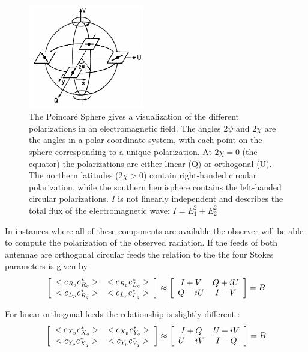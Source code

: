 \begin{figure}
\begin{mdframed}
\centering
\includegraphics[width=0.45\textwidth]{images/poincare_sphere.png}
\caption[The Poincar\'e Sphere]{The Poincar\'e Sphere gives a visualization of the different polarizations in an electromagnetic field. The angles $2\psi$ and
$2\chi$ are the angles in a polar coordinate system, with each point on the sphere corresponding to a unique polarization. At $2\chi=0$ (the equator) the polarizations
are either linear (Q) or orthogonal (U). The northern latitudes ($2\chi > 0$) contain right-handed circular polarization, while the southern hemisphere
contains the left-handed circular polarizations. $I$ is not linearly independent and describes the total flux of the electromagnetic wave: 
$I = E_1^2 + E_2^2$ \cite{wilson2009tools}}
\label{fig_poincare}
\end{mdframed}
\end{figure}

In instances where all of these components are available the observer will be able to compute the polarization of
the observed radiation. If the feeds of both antennae are orthogonal circular feeds the relation to
the the four Stokes parameters is given by
\begin{equation}
    \left[\begin{array}{c c}
     <e_{R_p}e_{R_q}^*> & <e_{R_p}e_{L_q}^*> \\
     <e_{L_p}e_{R_q}^*> & <e_{L_p}e_{L_q}^*> \\
    \end{array}\right] \approx 
    \left[\begin{array}{c c}
     I + V & Q + iU \\
     Q - iU & I - V \\
    \end{array}\right] = B
\end{equation}

For linear orthogonal feeds the relationship is slightly different \cite{2011A&A...527A.106S}:
\begin{equation}
    \left[\begin{array}{c c}
     <e_{X_p}e_{X_q}^*> & <e_{X_p}e_{Y_q}^*> \\
     <e_{Y_p}e_{X_q}^*> & <e_{Y_p}e_{Y_q}^*> \\
    \end{array}\right] \approx 
    \left[\begin{array}{c c}
     I + Q & U + iV \\
     U - iV & I - Q \\
    \end{array}\right] = B
\end{equation}

